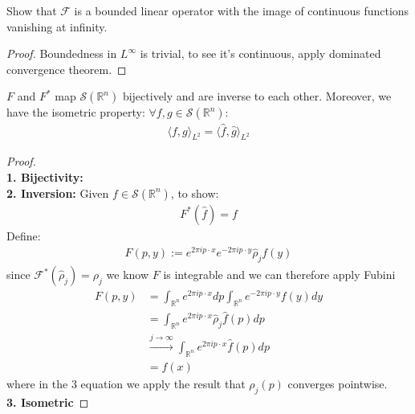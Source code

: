 \begin{definition}
	
\end{definition}

\begin{lemma}
Show that $\mathcal{F}$ is a bounded linear operator with the image of continuous functions vanishing at infinity.	
\end{lemma}
\begin{proof}
	Boundedness in $L^\infty$ is trivial, to see it's continuous, apply dominated convergence theorem.
\end{proof}

\begin{theorem}
$F$ and $F^*$ map $\mathcal{S}(\mathbb{R}^n)$ bijectively and are inverse to each other. Moreover, we have the isometric property: 
	$\forall f, g \in \mathcal{S}(\mathbb{R}^n)$:
	\begin{align*}
		\langle f, g \rangle_{L^2} = \langle \hat{f}, \hat{g} \rangle_{L^2}
	\end{align*}
\end{theorem}
\begin{proof}\quad\\
\textbf{1. Bijectivity:}    \\
\textbf{2. Inversion:} Given $f \in \mathcal{S}(\mathbb{R}^n)$, to show:
\begin{align*}
	 F^*(\hat{f}) = f
\end{align*}
Define:
\begin{align*}
	F(p, y):= e^{2\pi i p\cdot x} e^{-2\pi i p \cdot y} \hat{\rho}_j f(y)
\end{align*}
since $\mathcal{F}^*(\hat{\rho}_j) =\rho_j$ we know $F$ is integrable and we can therefore apply Fubini
\begin{align*}
	F(p, y) &= \int_{\mathbb{R}^n} e^{2\pi i p \cdot x} dp \int_{\mathbb{R}^n} e^{-2\pi i p \cdot y} f(y)dy\\
	&= \int_{\mathbb{R}^n} e^{2\pi i p \cdot x} \hat{\rho}_j \hat{f}(p) dp\\
	&\overset{j \rightarrow \infty}{\longrightarrow}
	\int_{\mathbb{R}^n} e^{2\pi i p \cdot x} \hat{f}(p) dp\\
	&= f(x)
\end{align*}
where in the 3 equation we apply the result that $\rho_j(p)$ converges pointwise.\\
\textbf{3. Isometric}
\end{proof}


